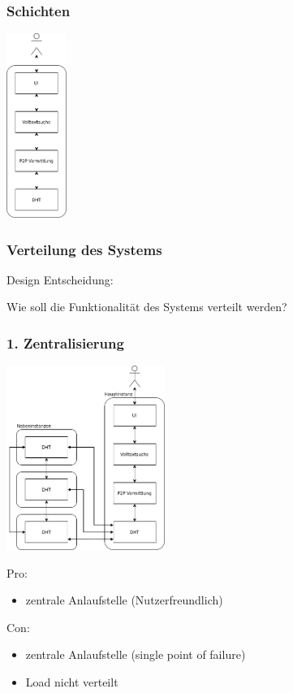 \documentclass{beamer}
\begin{document}
\begin{frame}
  \frametitle{Schichten}

  \begin{center}
    \includegraphics[height=6cm]{Schichten-alt}
  \end{center}
\end{frame}

\begin{frame}
  \frametitle{Verteilung des Systems}

  Design Entscheidung:

  Wie soll die Funktionalität des Systems verteilt werden?
\end{frame}

\begin{frame}[allowframebreaks]
  \frametitle{1. Zentralisierung}

  \begin{center}
    \includegraphics[height=6cm]{Hauptinstanz}
  \end{center}

  \break
  Pro:
  \begin{itemize}
    \item zentrale Anlaufstelle (Nutzerfreundlich)
  \end{itemize}

  Con:
  \begin{itemize}
    \item zentrale Anlaufstelle (single point of failure)
    \item Load nicht verteilt
  \end{itemize}
\end{frame}
\end{document}
